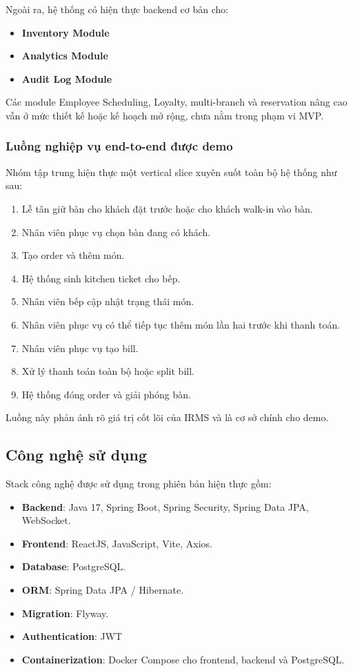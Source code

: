 \documentclass[12pt,a4paper]{article}
\begin{document}
Ngoài ra, hệ thống có hiện thực backend cơ bản cho:
\begin{itemize}
    \item \textbf{Inventory Module}
    \item \textbf{Analytics Module}
    \item \textbf{Audit Log Module}
\end{itemize}

Các module Employee Scheduling, Loyalty, multi-branch và reservation nâng cao vẫn ở mức thiết kế hoặc kế hoạch mở rộng, chưa nằm trong phạm vi MVP.

\subsubsection{Luồng nghiệp vụ end-to-end được demo}

Nhóm tập trung hiện thực một vertical slice xuyên suốt toàn bộ hệ thống như sau:
\begin{enumerate}
    \item Lễ tân giữ bàn cho khách đặt trước hoặc cho khách walk-in vào bàn.
    \item Nhân viên phục vụ chọn bàn đang có khách.
    \item Tạo order và thêm món.
    \item Hệ thống sinh kitchen ticket cho bếp.
    \item Nhân viên bếp cập nhật trạng thái món.
    \item Nhân viên phục vụ có thể tiếp tục thêm món lần hai trước khi thanh toán.
    \item Nhân viên phục vụ tạo bill.
    \item Xử lý thanh toán toàn bộ hoặc split bill.
    \item Hệ thống đóng order và giải phóng bàn.
\end{enumerate}

Luồng này phản ánh rõ giá trị cốt lõi của IRMS và là cơ sở chính cho demo.

\subsection{Công nghệ sử dụng}

Stack công nghệ được sử dụng trong phiên bản hiện thực gồm:
\begin{itemize}
    \item \textbf{Backend}: Java 17, Spring Boot, Spring Security, Spring Data JPA, WebSocket.
    \item \textbf{Frontend}: ReactJS, JavaScript, Vite, Axios.
    \item \textbf{Database}: PostgreSQL.
    \item \textbf{ORM}: Spring Data JPA / Hibernate.
    \item \textbf{Migration}: Flyway.
    \item \textbf{Authentication}: JWT
    \item \textbf{Containerization}: Docker Compose cho frontend, backend và PostgreSQL.
\end{itemize}
\end{document}
